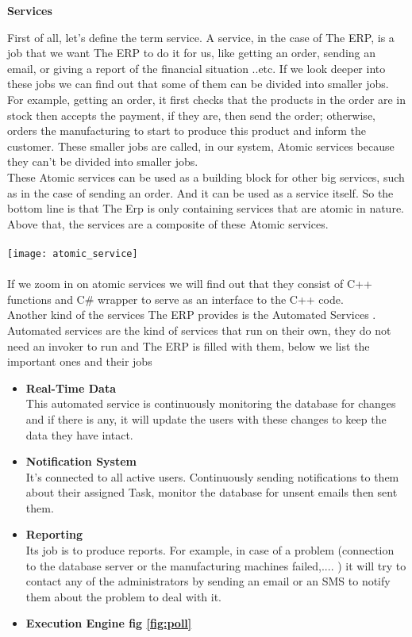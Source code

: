 \begin{adjustwidth}{2cm}{}
    \textbf{Services}\\
    
    \begin{adjustwidth}{1cm}{}
        First of all, let’s define the term service. A service, in the case of The ERP, is a job that we
want The ERP to do it for us, like getting an order, sending an email, or giving a report of the
financial situation ..etc.
If we look deeper into these jobs we can find out that some of them can be divided into
smaller jobs. For example, getting an order, it first checks that the products in the order are in
stock then accepts the payment, if they are, then send the order; otherwise, orders the
manufacturing to start to produce this product and inform the customer.
These smaller jobs are called, in our system, Atomic services because they can’t be divided
into smaller jobs.\\
These Atomic services can be used as a building block for other big services, such as in the
case of sending an order. And it can be used as a service itself. So the bottom line is that The
Erp is only containing services that are atomic in nature.
Above that, the services are a composite of these Atomic services.\\\\
\texttt{[image: atomic\_service]}\\\\
If we zoom in on atomic services we will find out that they consist of C++ functions and C\#
wrapper to serve as an interface to the C++ code.\\
Another kind of the services The ERP provides is the Automated Services .
Automated services are the kind of services that run on their own, they do not need an invoker
to run and The ERP is filled with them, below we list the important ones and their jobs\\
\begin{itemize}
    \item \textbf{Real-Time Data}\\ This automated service is continuously monitoring the database for changes and if there is
    any, it will update the users with these changes to keep the data they have intact.\\
    \item \textbf{Notification System}\\ It’s connected to all active users. Continuously sending notifications to them about their
    assigned Task, monitor the database for unsent emails then sent them.\\
    \item \textbf{Reporting}\\ Its job is to produce reports. For example, in case of a problem (connection to the database
    server or the manufacturing machines failed,.... ) it will try to contact any of the
    administrators by sending an email or an SMS to notify them about the problem to deal with
    it.\\
    \item \textbf{Execution Engine fig \ref{fig:poll}}\\
    

\end{itemize}
\end{adjustwidth}
\end{adjustwidth}
